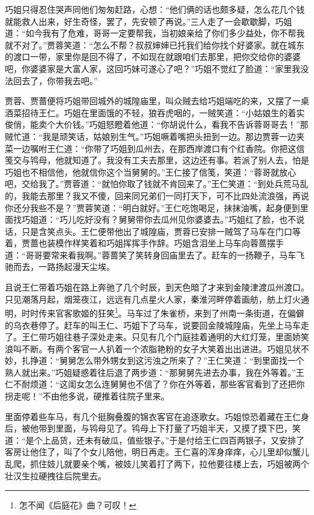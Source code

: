 \documentclass[12pt,oneside]{book}
\begin{document}
巧姐只得忍住哭声同他们匆匆赶路，心想：“他们俩的话也颇多疑，怎么花几个钱就能救人出来，好生奇怪，罢了，先安顿了再说。”三人走了一会歇歇脚，巧姐道：“如今我有了危难，哥哥一定要帮我，当初娘亲给了你们多少益处，你不帮我就不对了。”贾蓉笑道：“怎么不帮？叔叔婶婶已托我们给你找个好婆家。就在城东的渡口一带，家里你是回不得了，不如现在就跟咱们去那里，把你交给你的婆婆吧，你婆婆家是大富人家，这回巧妹可遂心了吧？”巧姐不觉红了脸道：“家里我没法回去了，你带我去吧。”

贾蓉、贾蔷便将巧姐带回城外的城隍庙里，叫众贼去给巧姐端吃的来，又摆了一桌酒菜招待王仁。巧姐在里面饿的不轻，狼吞虎咽的，一贼笑道：“小姑娘生的着实俊俏，能卖个大价钱。”巧姐怒瞪着他道：“你胡说什么，看我不告诉蓉哥哥去！”那贼忙道：“我是顽笑话，姑娘别生气。”巧姐噘着嘴把头扭到一边。那边贾蓉一边夹菜一边嘱咐王仁道：“你带了巧姐到瓜州去，在那西岸渡口有个红香院。你把这信笺交与鸨母，他就知道了。我没有工夫去那里，这边还有事。若派了别人去，怕是巧姐也不相信他，他就信你这个当舅舅的。”王仁接了信笺，笑道：“蓉哥就放心吧，交给我了。”贾蓉道：“就怕你取了钱就不肯回来了。”王仁笑道：“到处兵荒马乱的，我能去那里？我又不傻，回来同兄弟们一同打天下，可不比四处流浪强，再说你还分我些不是？”贾蓉笑道：“明白就好。”王仁吃饱喝足，抹抹油嘴，起身便到里面找巧姐道：“巧儿吃好没有？舅舅带你去瓜州见你婆婆去。”巧姐红了脸，也不说话，只是含笑点头。王仁便带他出了城隍庙，贾蓉已安排一贼驾了马车在门口等着，贾蔷也装模作样笑着和巧姐挥挥手作辞。巧姐含泪坐上马车向蓉蔷摆手道：“哥哥要常来看我啊。”蓉蔷笑了笑转身回庙里去了。赶车的一扬鞭子，马车飞驰而去，一路扬起漫天尘埃。

且说王仁带着巧姐在路上奔驰了几个时辰，到天色暗了才来到金陵津渡瓜州渡口。只见潮落月起，烟笼夜江，远远有几点星火人家，秦淮河畔停着画舫，舫上灯火通明，时时传来官客歌姬的狂笑\footnote{怎不闻《后庭花》曲？可叹！}。马车过了朱雀桥，来到了州南一条街道，在偏僻的乌衣巷停了。赶车的叫王仁、巧姐下了马车，说要回金陵城隍庙，先坐上马车走了。王仁带巧姐往巷子深处走来。只见有几个门庭挂着通明的大红灯笼，里面娇笑浪叫不断。有两个客官一人扒着一个浓脂艳粉的女子大笑着出出进进。巧姐见状不妙，扎挣道：“舅舅怎么带外甥女到这污浊之所来了？”王仁笑道：“到里面找一个熟人就出来。”巧姐疑惑着往后退了两步道：“那舅舅先进去办事，我在外等着。”王仁不耐烦道：“这闺女怎么连舅舅也不信了？你在外等着，那些客官看到了还把你拐走呢！”不由他多说，硬推着往院子里来。

里面停着些车马，有几个挺胸叠腹的锦衣客官在追逐歌女。巧姐惊恐着藏在王仁身后，被他带到里面，与鸨母见了。鸨母上下打量了巧姐半天，又摸了摸下巴，笑道：“是个上品货，还未有破瓜，值些银子。”于是付给王仁四百两银子，又安排了客房让他住了，叫了个女儿陪他，明日再走。王仁喜的浑身痒痒，心儿里却似蟹儿乱爬，抓住妓儿就要亲个嘴，被妓儿笑着打了两下，拉他要往楼上去，巧姐被两个壮汉生拉硬拽往后院里去。
\end{document}
